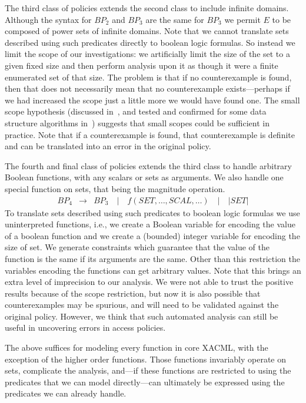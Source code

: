 The third class of policies extends the second class to include
infinite domains. Although the syntax for $BP_2$ and $BP_3$ are the
same for $BP_3$ we permit $E$ to be composed of power sets of infinite
domains.  Note that we cannot translate sets described using such
predicates directly to boolean logic formulas.  So instead we limit
the scope of our investigations: we artificially limit the size of the
set to a given fixed size and then perform analysis upon it as though
it were a finite enumerated set of that size. The problem is that if
no counterexample is found, then that does not necessarily mean that
no counterexample exists---perhaps if we had increased the scope just
a little more we would have found one. The small scope hypothesis
(discussed in~\cite{jackson:elements}, and tested and confirmed for
some data structure algorithms in~\cite{marinov:exhaustive}) suggests
that small scopes could be sufficient in practice. Note that if a
counterexample is found, that counterexample is definite and can be
translated into an error in the original policy.

The fourth and final class of policies extends the third class to
handle arbitrary Boolean functions, with any scalars or sets as
arguments. We also handle one special function on sets, that being the
magnitude operation.
\begin{eqnarray*}
  BP_4 & \rightarrow & BP_3 \quad | \quad f (SET, \dots, SCAL, \dots)
\quad | \quad | SET | 
\end{eqnarray*}
To translate sets described using such predicates to boolean logic
formulas we use uninterpreted functions, i.e., we create a Boolean
variable for encoding the value of a boolean function and we create a
(bounded) integer variable for encoding the size of set. We generate
constraints which guarantee that the value of the function is the same
if its arguments are the same. Other than this restriction the
variables encoding the functions can get arbitrary values.  Note that
this brings an extra level of imprecision to our analysis.  We were
not able to trust the positive results because of the scope
restriction, but now it is also possible that counterexamples may be
spurious, and will need to be validated against the original policy.
However, we think that such automated analysis can still be useful in
uncovering errors in access policies.

The above suffices for modeling every function in core XACML, with the
exception of the higher order functions.  Those functions invariably
operate on sets, complicate the analysis, and---if these functions are
restricted to using the predicates that we can model directly---can
ultimately be expressed using the predicates we can already handle.

